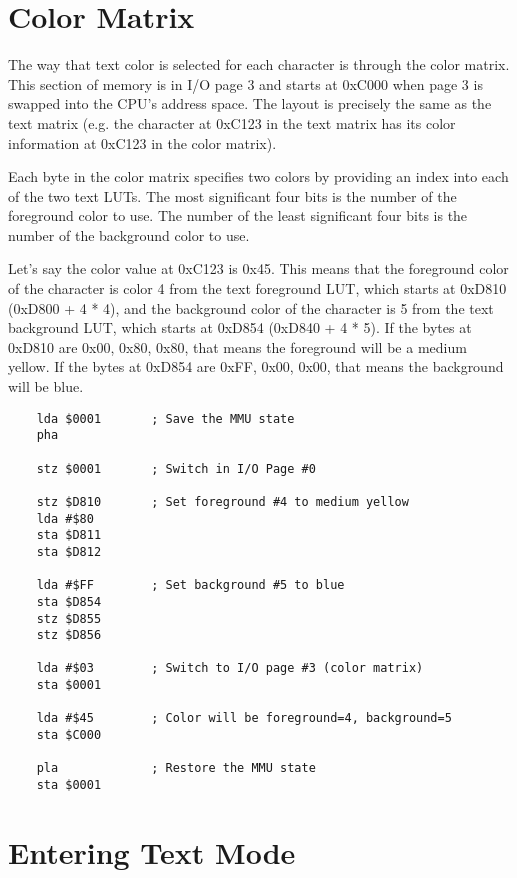 \section*{Color Matrix}

The way that text color is selected for each character is through the color matrix. This section of memory is in I/O page 3 and starts at 0xC000 when page 3 is swapped into the CPU's address space. The layout is precisely the same as the text matrix (e.g. the character at 0xC123 in the text matrix has its color information at 0xC123 in the color matrix).

Each byte in the color matrix specifies two colors by providing an index into each of the two text LUTs. The most significant four bits is the number of the foreground color to use. The number of the least significant four bits is the number of the background color to use.

Let's say the color value at 0xC123 is 0x45. This means that the foreground color of the character is color 4 from the text foreground LUT, which starts at 0xD810 (0xD800 + 4 * 4), and the background color of the character is 5 from the text background LUT, which starts at 0xD854 (0xD840 + 4 * 5). If the bytes at 0xD810 are 0x00, 0x80, 0x80, that means the foreground will be a medium yellow. If the bytes at 0xD854 are 0xFF, 0x00, 0x00, that means the background will be blue.

\begin{verbatim}
    lda $0001       ; Save the MMU state
    pha

    stz $0001       ; Switch in I/O Page #0

    stz $D810       ; Set foreground #4 to medium yellow
    lda #$80
    sta $D811
    sta $D812

    lda #$FF        ; Set background #5 to blue
    sta $D854
    stz $D855
    stz $D856

    lda #$03        ; Switch to I/O page #3 (color matrix)
    sta $0001

    lda #$45        ; Color will be foreground=4, background=5
    sta $C000

    pla             ; Restore the MMU state
    sta $0001
\end{verbatim}

\section*{Entering Text Mode}

